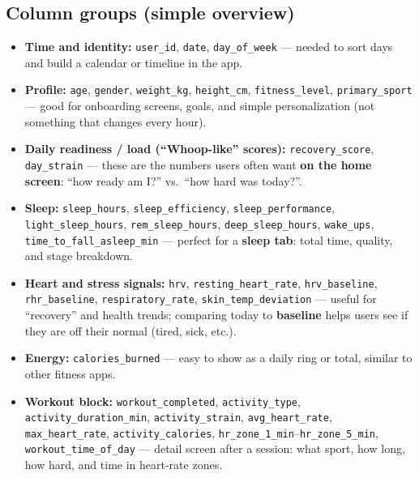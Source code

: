 \documentclass[11pt,a4paper]{article}
\begin{document}
\subsection{Column groups (simple overview)}
\begin{itemize}[leftmargin=*]
  \item \textbf{Time and identity:} \texttt{user\_id}, \texttt{date}, \texttt{day\_of\_week} --- needed to sort days and build a calendar or timeline in the app.
  \item \textbf{Profile:} \texttt{age}, \texttt{gender}, \texttt{weight\_kg}, \texttt{height\_cm}, \texttt{fitness\_level}, \texttt{primary\_sport} --- good for onboarding screens, goals, and simple personalization (not something that changes every hour).
  \item \textbf{Daily readiness / load (``Whoop-like'' scores):} \texttt{recovery\_score}, \texttt{day\_strain} --- these are the numbers users often want \textbf{on the home screen}: ``how ready am I?'' vs.\ ``how hard was today?''.
  \item \textbf{Sleep:} \texttt{sleep\_hours}, \texttt{sleep\_efficiency}, \texttt{sleep\_performance}, \texttt{light\_sleep\_hours}, \texttt{rem\_sleep\_hours}, \texttt{deep\_sleep\_hours}, \texttt{wake\_ups}, \texttt{time\_to\_fall\_asleep\_min} --- perfect for a \textbf{sleep tab}: total time, quality, and stage breakdown.
  \item \textbf{Heart and stress signals:} \texttt{hrv}, \texttt{resting\_heart\_rate}, \texttt{hrv\_baseline}, \texttt{rhr\_baseline}, \texttt{respiratory\_rate}, \texttt{skin\_temp\_deviation} --- useful for ``recovery'' and health trends; comparing today to \textbf{baseline} helps users see if they are off their normal (tired, sick, etc.).
  \item \textbf{Energy:} \texttt{calories\_burned} --- easy to show as a daily ring or total, similar to other fitness apps.
  \item \textbf{Workout block:} \texttt{workout\_completed}, \texttt{activity\_type}, \texttt{activity\_duration\_min}, \texttt{activity\_strain}, \texttt{avg\_heart\_rate}, \texttt{max\_heart\_rate}, \texttt{activity\_calories}, \texttt{hr\_zone\_1\_min}--\texttt{hr\_zone\_5\_min}, \texttt{workout\_time\_of\_day} --- detail screen after a session: what sport, how long, how hard, and time in heart-rate zones.
\end{itemize}
\end{document}
